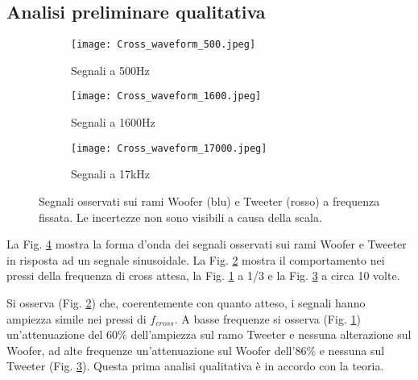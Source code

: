 \documentclass[../Relazione_circuiti]{subfiles}
\begin{document}
\subsection{Analisi preliminare qualitativa}

  \begin{figure}[H]
    \centering

    \begin{subfigure}[b]{0.3\textwidth}
      \centering
      \texttt{[image: Cross\_waveform\_500.jpeg]}

      \caption{Segnali a 500Hz}
      \label{fig:signal_500}

    \end{subfigure}
    \hfill
    \begin{subfigure}[b]{0.3\textwidth}
      \centering
      \texttt{[image: Cross\_waveform\_1600.jpeg]}

      \caption{Segnali a 1600Hz}
      \label{fig:signal_1600}

    \end{subfigure}
    \hfill
    \begin{subfigure}[b]{0.3\textwidth}
      \centering
      \texttt{[image: Cross\_waveform\_17000.jpeg]}

      \caption{Segnali a 17kHz}
      \label{fig:signal_17k}

    \end{subfigure}

    \caption{Segnali osservati sui rami Woofer (blu) e Tweeter (rosso)
      a frequenza fissata. Le incertezze non sono visibili a causa della scala.}
    \label{fig:signal_waveforms}

  \end{figure}

  La Fig. \ref{fig:signal_waveforms} mostra la forma d'onda dei segnali osservati sui rami Woofer e Tweeter in risposta
  ad un segnale sinusoidale.
  La Fig. \ref{fig:signal_1600} mostra il comportamento nei pressi della frequenza di cross attesa, la Fig.
  \ref{fig:signal_500} a 1/3 e la Fig. \ref{fig:signal_17k} a circa 10 volte.

  Si osserva (Fig. \ref{fig:signal_1600}) che, coerentemente con quanto atteso, i segnali hanno ampiezza simile nei
  pressi di $f_{cross}$.
  A basse frequenze si osserva (Fig. \ref{fig:signal_500}) un'attenuazione del 60\% dell'ampiezza sul ramo Tweeter e
  nessuna alterazione sul Woofer, ad alte frequenze un'attenuazione sul Woofer dell'86\% e nessuna sul Tweeter (Fig.
  \ref{fig:signal_17k}). Questa prima analisi qualitativa è in accordo con la teoria.
\end{document}
